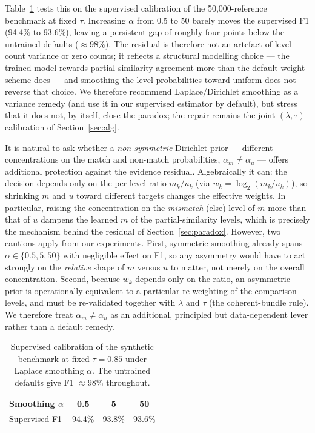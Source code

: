 \documentclass[conference]{IEEEtran}
\begin{document}
Table~\ref{tab:smooth} tests this on the supervised calibration of the 50{,}000-reference
benchmark at fixed $\tau$. Increasing $\alpha$ from 0.5 to 50 barely moves the supervised
F1 (94.4\% to 93.6\%), leaving a persistent gap of roughly four points below the untrained
defaults ($\approx98\%$). The residual is therefore not an artefact of level-count variance
or zero counts; it reflects a structural modelling choice --- the trained model rewards
partial-similarity agreement more than the default weight scheme does --- and smoothing the
level probabilities toward uniform does not reverse that choice. We therefore recommend
Laplace/Dirichlet smoothing as a variance remedy (and use it in our supervised estimator by
default), but stress that it does not, by itself, close the paradox; the repair remains the
joint $(\lambda,\tau)$ calibration of Section~\ref{sec:alg}.

It is natural to ask whether a \emph{non-symmetric} Dirichlet prior --- different
concentrations on the match and non-match probabilities, $\alpha_m\neq\alpha_u$ --- offers
additional protection against the evidence residual. Algebraically it can: the decision
depends only on the per-level ratio $m_k/u_k$ (via $w_k=\log_2(m_k/u_k)$), so shrinking
$m$ and $u$ toward different targets changes the effective weights. In particular, raising
the concentration on the \emph{mismatch} (else) level of $m$ more than that of $u$ dampens
the learned $m$ of the partial-similarity levels, which is precisely the mechanism behind the
residual of Section~\ref{sec:paradox}. However, two cautions apply from our experiments.
First, symmetric smoothing already spans $\alpha\in\{0.5,5,50\}$ with negligible effect on
F1, so any asymmetry would have to act strongly on the \emph{relative} shape of $m$ versus
$u$ to matter, not merely on the overall concentration. Second, because $w_k$ depends only
on the ratio, an asymmetric prior is operationally equivalent to a particular re-weighting of
the comparison levels, and must be re-validated together with $\lambda$ and $\tau$ (the
coherent-bundle rule). We therefore treat $\alpha_m\neq\alpha_u$ as an additional, principled
but data-dependent lever rather than a default remedy.

\begin{table}[h]
\centering
\caption{Supervised calibration of the synthetic benchmark at fixed $\tau=0.85$ under
Laplace smoothing $\alpha$. The untrained defaults give F1 $\approx98\%$ throughout.}
\label{tab:smooth}
\begin{tabular}{lccc}
\toprule
Smoothing $\alpha$ & 0.5 & 5 & 50 \\
\midrule
Supervised F1 & 94.4\% & 93.8\% & 93.6\% \\
\bottomrule
\end{tabular}
\end{table}
\end{document}
